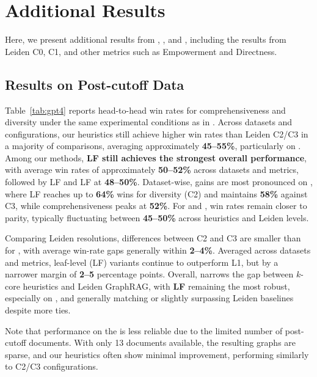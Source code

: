 \section{Additional Results}

Here, we present additional results from \threepointfive, \four, and \five, including the results from Leiden C0, C1, and other metrics such as Empowerment and Directness.



\subsection{\four Results on Post-cutoff Data}
Table~\ref{tab:gpt4} reports head-to-head win rates for comprehensiveness and diversity under the same experimental conditions as in \threepointfive.
Across datasets and configurations, our heuristics still achieve higher win rates than Leiden C2/C3 in a majority of comparisons, averaging approximately \textbf{45--55\%}, particularly on \semi.
Among our methods, {\bf \MHC LF still achieves the strongest overall performance}, with average win rates of approximately \textbf{50--52\%} across datasets and metrics, followed by \KHC LF and \MRC LF at \textbf{48--50\%}. 
Dataset-wise, gains are most pronounced on \semi, where \MHC LF reaches up to \textbf{64\%} wins for diversity (C2) and maintains \textbf{58\%} against C3, while comprehensiveness peaks at \textbf{52\%}. 
For \podcast and \news, win rates remain closer to parity, typically fluctuating between \textbf{45--50\%} across heuristics and Leiden levels.

Comparing Leiden resolutions, differences between C2 and C3 are smaller than for \threepointfive, with average win-rate gaps generally within \textbf{2--4\%}. 
Averaged across datasets and metrics, leaf-level (LF) variants continue to outperform L1, but by a narrower margin of \textbf{2--5} percentage points.
Overall, \four narrows the gap between $k$-core heuristics and Leiden GraphRAG, with \textbf{\MHC LF} remaining the most robust, especially on \semi, and generally matching or slightly surpassing Leiden baselines despite more ties.

Note that performance on the \podcast is less reliable due to the limited number of post-cutoff documents. With only 13 documents available, the resulting graphs are sparse, and our heuristics often show minimal improvement, performing similarly to C2/C3 configurations.




